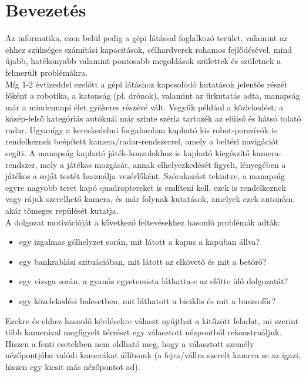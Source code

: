 \chapter*{Bevezetés}

Az informatika, ezen belül pedig a gépi látással foglalkozó terület, valamint az ehhez szükséges számítási kapacitások, célhardverek rohamos fejlődésével, mind újabb, hatékonyabb valamint pontosabb megoldások születtek és születnek a felmerült problémákra.\\

Míg 1-2 évtizeddel ezelőtt a gépi látáshoz kapcsolódó kutatások jelentős részét főként a robotika, a katonság (pl. drónok), valamint az űrkutatás adta, manapság már a mindennapi élet gyökeres részévé vált. Vegyük például a közlekedést; a közép-felső kategóriás autóknál már szinte széria tartozék az elülső és hátsó tolató radar. Ugyanígy a kereskedelmi forgalomban kapható kis robot-porszívók is rendelkeznek beépített kamera/radar-rendszerrel, amely a beltéri navigációt segíti. A manapság kapható játék-konzolokhoz is kapható kiegészítő kamera-rendszer, mely a játékos mozgását, annak elhelyezkedését figyeli, lényegében a játékos a saját testét használja vezérlőként. Szórakozást tekintve, a manapság egyre nagyobb teret kapó quadroptereket \cite{quadropter} is említeni kell, ezek is rendelkeznek vagy rájuk szerelhető kamera, és már folynak kutatások, amelyek ezek autonóm, akár tömeges repülését kutatja.\\

A dolgozat motivációját a következő feltevésekhez hasonló problémák adták:
\begin{itemize}
\item egy izgalmas gólhelyzet során, mit látott a kapus a kapuban állva?
\item egy bankrablási szituációban, mit látott az elkövető és mit a betörő?
\item egy vizsga során, a gyanús egyetemista láthatta-e az előtte ülő dolgozatát?
\item egy közelekedési balesetben, mit láthatott a biciklis és mit a buszsofőr?
\end{itemize}

Ezekre és ehhez hasonló kérdésekre választ nyújthat a kitűzött feladat, mi szerint több kamerával megfigyelt térrészt egy választott nézpontból rekonstruáljuk. Hiszen a fenti esetekben nem oldható meg, hogy a választott személy nézőpontjába valódi kamerákat állítsunk (a fejra/vállra szerelt kamera se az igazi, hiszen egy kicsit más nézőpontot ad).\\


